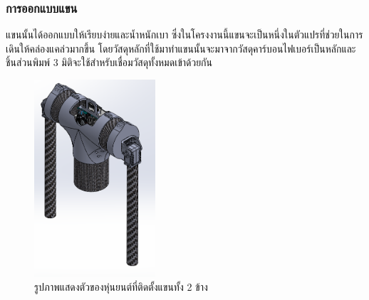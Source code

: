 \subsubsection{การออกแบบแขน}
แขนนั้นได้ออกแบบให้เรียบง่ายและน้ำหนักเบา ซึ่งในโครงงานนี้แขนจะเป็นหนึ่งในตัวแปรที่ช่วยในการเดินให้คล่องแคล่วมากขึ้น
โดยวัสดุหลักที่ใช้มาทำแขนนั้นจะมาจากวัสดุคาร์บอนไฟเบอร์เป็นหลักและชิ้นส่วนพิมพ์ 3 มิติจะใช้สำหรับเชื่อมวัสดุทั้งหมดเข้าด้วยกัน
\begin{figure}[h!]
  \centering
  \includegraphics[width=0.4\textwidth]{chapter4/images/troso.PNG}
  \caption{รูปภาพแสดงตัวของหุ่นยนต์ที่ติดตั้งแขนทั้ง 2 ข้าง}
  \label{fig:troso}
\end{figure}



